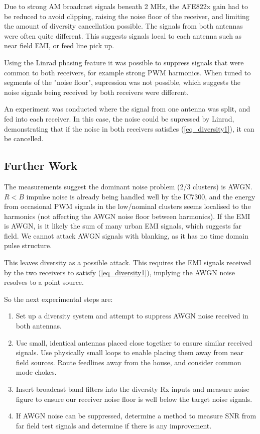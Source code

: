 \documentclass{article}
\begin{document}
Due to strong AM broadcast signals beneath 2 MHz, the AFE822x gain had to be reduced to avoid clipping, raising the noise floor of the receiver, and limiting the amount of diversity cancellation possible. The signals from both antennas were often quite different.  This suggests signals local to each antenna such as near field EMI, or feed line pick up.

Using the Linrad phasing feature \cite{linrad_phasing} it was possible to suppress signals that were common to both receivers, for example strong PWM harmonics.  When tuned to segments of the "noise floor", supression was not possible, which suggests the noise signals being received by both receivers were different.

An experiment was conducted where the signal from one antenna was split, and fed into each receiver.  In this case, the noise could be supressed by Linrad, demonstrating that if the noise in both receivers satisfies (\ref{eq_diversity1}), it can be cancelled.
  
\subsection{Further Work}

The measurements suggest the dominant noise problem (2/3 clusters) is AWGN. $R<B$ impulse noise is already being handled well by the IC7300, and the energy from occasional PWM signals in the low/nominal clusters seems localised to the harmonics (not affecting the AWGN noise floor between harmonics).  If the EMI is AWGN, is it likely the sum of many urban EMI signals, which suggests far field.  We cannot attack AWGN signals with blanking, as it has no time domain pulse structure.

This leaves diversity as a possible attack.  This requires the EMI signals received by the two receivers to satisfy (\ref{eq_diversity1}), implying the AWGN noise resolves to a point source.

So the next experimental steps are:
\begin{enumerate}
\item Set up a diversity system and attempt to suppress AWGN noise received in both antennas.
\item Use small, identical antennas placed close together to ensure similar received signals. Use physically small loops to enable placing them away from near field sources.  Route feedlines away from the house, and consider common mode chokes.
\item Insert broadcast band filters into the diversity Rx inputs and measure noise figure to ensure our receiver noise floor is well below the target noise signals.
\item If AWGN noise can be suppressed, determine a method to measure SNR from far field test signals and determine if there is any improvement.
\end{enumerate}



\end{document}
